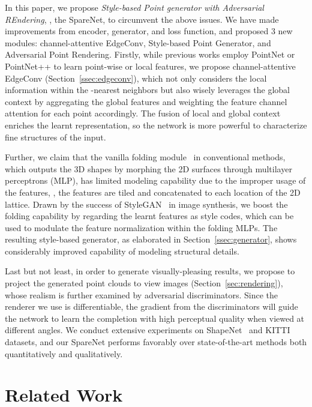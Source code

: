 \documentclass[final]{cvpr}
\begin{document}
In this paper, we propose  \emph{Style-based Point generator with Adversarial REndering}, \ie, the SpareNet, to circumvent the above issues. We have made improvements from encoder, generator, and loss function, and proposed 3 new modules: channel-attentive EdgeConv, Style-based Point Generator, and Adversarial Point Rendering. Firstly, while previous works employ PointNet or PointNet++ to learn point-wise or local features, we propose channel-attentive EdgeConv (Section~\ref{ssec:edgeconv}), which not only considers the local information within the -nearest neighbors but also wisely leverages the global context by aggregating the global features and weighting the feature channel attention for each point accordingly. The fusion of local and global context enriches the learnt representation, so the network is more powerful to characterize fine structures of the input. 

Further, we claim that the vanilla folding module~\cite{foldingnet_2018_CVPR} in conventional methods, which outputs the 3D shapes by morphing the 2D surfaces through multilayer perceptrons (MLP), has limited modeling capability due to the improper usage of the features, \ie, the features are tiled and concatenated to each location of the 2D lattice. Drawn by the success of StyleGAN~\cite{karras2019style} in image synthesis, we boost the folding capability by regarding the learnt features as style codes, which can be used to modulate the feature normalization within the folding MLPs. The resulting style-based generator, as elaborated in Section~\ref{ssec:generator}, shows considerably improved capability of modeling structural details. 

Last but not least, in order to generate visually-pleasing results, we propose to project the generated point clouds to view images (Section~\ref{sec:rendering}), whose realism is further examined by adversarial discriminators. Since the renderer we use is differentiable, the gradient from the discriminators will guide the network to learn the completion with high perceptual quality when viewed at different angles. We conduct extensive experiments on ShapeNet~\cite{chang2015shapenet} and KITTI~\cite{geiger2013vision} datasets, and our SpareNet performs favorably over state-of-the-art methods both quantitatively and qualitatively.


\section{Related Work}
\end{document}
